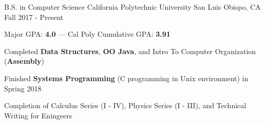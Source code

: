 

\begin{cventries}

  \cventry
    {B.S. in Computer Science} %
    {California Polytechnic University} %
    {San Luis Obispo, CA} %
    {Fall 2017 - Present} %
    {
      \begin{cvitems} %
        \item {Major GPA: \textbf{4.0} --- Cal Poly Cumulative GPA: \textbf{3.91}}
        \item {Completed \textbf{Data Structures}, \textbf{OO Java}, and Intro To Computer Organization (\textbf{Assembly})}
        \item {Finished \textbf{Systems Programming} (C programming in Unix environment) in Spring 2018}
        \item {Completion of Calculus Series (I - IV), Physics Series (I - III), and Technical Writing for Eningeers}
      \end{cvitems}
    }

\end{cventries}
